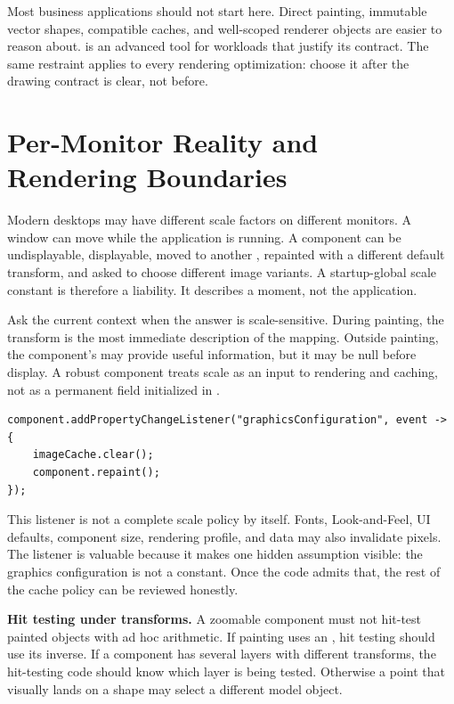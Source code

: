 Most business applications should not start here. Direct painting, immutable vector shapes, compatible  caches, and well-scoped renderer objects are easier to reason about.  is an advanced tool for workloads that justify its contract. The same restraint applies to every rendering optimization: choose it after the drawing contract is clear, not before.

\section{Per-Monitor Reality and Rendering Boundaries}

Modern desktops may have different scale factors on different monitors. A window can move while the application is running. A component can be undisplayable, displayable, moved to another , repainted with a different default transform, and asked to choose different image variants. A startup-global scale constant is therefore a liability. It describes a moment, not the application.

Ask the current context when the answer is scale-sensitive. During painting, the  transform is the most immediate description of the mapping. Outside painting, the component's  may provide useful information, but it may be null before display. A robust component treats scale as an input to rendering and caching, not as a permanent field initialized in .

\begin{lstlisting}[caption={Observing graphics configuration changes for cache invalidation.}]
component.addPropertyChangeListener("graphicsConfiguration", event -> {
    imageCache.clear();
    component.repaint();
});
\end{lstlisting}

This listener is not a complete scale policy by itself. Fonts, Look-and-Feel, UI defaults, component size, rendering profile, and data may also invalidate pixels. The listener is valuable because it makes one hidden assumption visible: the graphics configuration is not a constant. Once the code admits that, the rest of the cache policy can be reviewed honestly.

\textbf{Hit testing under transforms.} A zoomable component must not hit-test painted objects with ad hoc arithmetic. If painting uses an , hit testing should use its inverse. If a component has several layers with different transforms, the hit-testing code should know which layer is being tested. Otherwise a point that visually lands on a shape may select a different model object.

